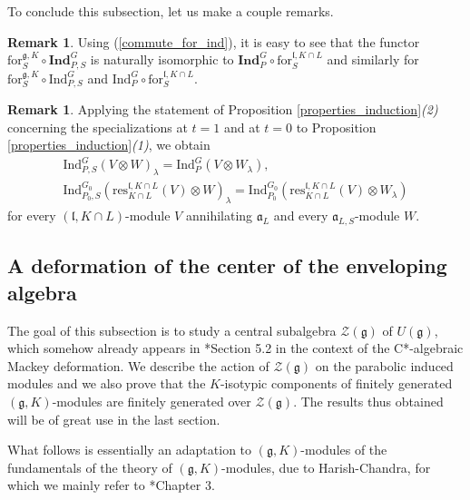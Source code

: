 \documentclass{amsart}
\theoremstyle{definition}
\newtheorem{remark}[theorem]{Remark}
\begin{document}
To conclude this subsection, let us make a couple remarks.

\begin{remark}\label{commute_parInd_for}
    Using (\ref{commute_for_ind}), it is easy to see that the functor $\mathrm{for}_S^{\bm{\mathfrak{g}},K}\circ\mathbf{Ind}_{P,S}^G$ is naturally isomorphic to $\mathbf{Ind}_{P}^G \circ \mathrm{for}_S^{\mathfrak{l},K\cap L}$ and similarly for $\mathrm{for}_S^{\bm{\mathfrak{g}},K}\circ\mathrm{Ind}_{P,S}^G$ and $\mathrm{Ind}_{P}^G \circ \mathrm{for}_S^{\mathfrak{l},K\cap L}$.
\end{remark}

\begin{remark}\label{specialization_lambda}
    Applying the statement of Proposition \ref{properties_induction}\textit{(2)} concerning the specializations at $t = 1$ and at $t=0$ to Proposition \ref{properties_induction}\textit{(1)}, we obtain
        \begin{gather*}\mathrm{Ind}_{P,S}^G(V \otimes W)_\lambda = \mathrm{Ind}_{P}^G(V \otimes W_\lambda),\\
        \mathrm{Ind}_{P_0,S}^{G_0}(\mathrm{res}_{K\cap L}^{\mathfrak{l}, K\cap L}(V)\otimes W)_\lambda = \mathrm{Ind}_{P_0}^{G_0}(\mathrm{res}_{K\cap L}^{\mathfrak{l}, K\cap L}(V)\otimes W_\lambda)\end{gather*}
        for every $(\mathfrak{l},K\cap L)$-module $V$ annihilating $\mathfrak{a}_L$ and every $\mathfrak{a}_{L,S}$-module $W$.
\end{remark}

\subsection{A deformation of the center of the enveloping algebra}\label{Center}
The goal of this subsection is to study a central subalgebra $\mathcal{Z}(\bm{\mathfrak{g}})$ of $U(\bm{\mathfrak{g}})$, which somehow already appears in \cite{BHY_operator}*{Section 5.2} in the context of the C*-algebraic Mackey deformation. We describe the action of $\mathcal{Z}(\bm{\mathfrak{g}})$ on the parabolic induced modules and we also prove that the $K$-isotypic components of finitely generated $(\bm{\mathfrak{g}},K)$-modules are finitely generated over $\mathcal{Z}(\bm{\mathfrak{g}})$. The results thus obtained will be of great use in the last section.

What follows is essentially an adaptation to $(\bm{\mathfrak{g}},K)$-modules of the fundamentals of the theory of $(\mathfrak{g},K)$-modules, due to Harish-Chandra, for which we mainly refer to \cite{Wallach}*{Chapter 3}.
\end{document}
